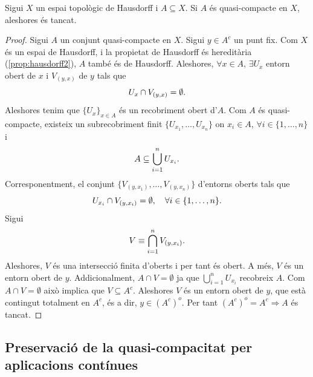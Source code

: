 \documentclass[../main.tex]{subfiles}
\begin{document}
\begin{prop}
\label{prop:ent2qcimplicatancat} Sigui $X$ un espai topològic de Hausdorff i $A\subseteq X$. Si $A$ és quasi-compacte en $X$, aleshores és tancat.
\end{prop}
\begin{proof}
Sigui $A$ un conjunt quasi-compacte en $X$. Sigui $y\in A^c$ un punt fix. Com $X$ és un espai de Hausdorff, i la propietat de Hausdorff és hereditària 
(\ref{prop:hausdorff2}), $A$ també és de Hausdorff. Aleshores, $\forall x\in A$, $\exists U_x$ entorn obert de $x$ i $V_{(y,x)}$ de $y$ tals que
\begin{equation}
    \notag
    U_x\cap V_{(y,x)} = \emptyset.
\end{equation}
Aleshores tenim que $\{U_x\}_{x\in A}$ és un recobriment obert d'$A$. Com $A$ és quasi-compacte, existeix un subrecobriment finit $\{U_{x_1},\ldots,U_{x_n}\}$ on $x_i\in A$, $\forall i\in\{1,\ldots,n\}$ i 
\begin{equation}
    \notag
    A\subseteq \bigcup_{i=1}^n U_{x_i}.
\end{equation}
Corresponentment, el conjunt $\{V_{(y,x_1)},\ldots,V_{(y,x_n)}\}$ d'entorns oberts tals que
\begin{equation}
    \notag
    U_{x_i}\cap V_{(y,x_i)} = \emptyset,\quad \forall i\in\{1,\ldots,n\} .
\end{equation}
Sigui
\begin{equation}
    \notag
    V\equiv \bigcap_{i=1}^n V_{(y,x_i)}.
\end{equation}
Aleshores, $V$ és una intersecció finita d'oberts i per tant és obert. A més, $V$ és un entorn obert de $y$. Addicionalment, $A\cap V = \emptyset$ ja que $\bigcup_{i=1}^n U_{x_i}$ recobreix $A$. Com $A\cap V = \emptyset$ això implica que $V\subseteq A^c$. Aleshores $V$ és un entorn obert de $y$, que està contingut totalment en $A^c$, és a dir, $y\in(A^c)^{o}$. Per tant $(A^c)^{o} = A^c\Rightarrow A$ és tancat.
\end{proof}

\subsection{Preservació de la quasi-compacitat per aplicacions contínues}
\end{document}
